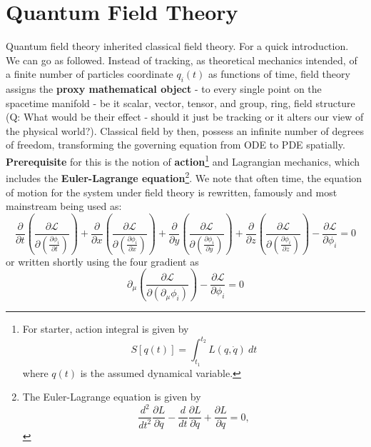 \documentclass[10pt]{article}
\begin{document}
\section{Quantum Field Theory}

Quantum field theory inherited classical field theory. For a quick introduction. We can go as followed. Instead of tracking, as theoretical mechanics intended, of a finite number of particles coordinate $q_{i}(t)$ as functions of time, field theory assigns the \textbf{proxy mathematical object} - to every single point on the spacetime manifold - be it scalar, vector, tensor, and group, ring, field structure (Q: What would be their effect - should it just be tracking or it alters our view of the physical world?). Classical field by then, possess an infinite number of degrees of freedom, transforming the governing equation from ODE to PDE spatially. \textbf{Prerequisite} for this is the notion of \textbf{action}\footnote{For starter, action integral is given by \begin{equation}
  S[q(t)] = \int_{t_{1}}^{t_2} L(q,\dot{q})\: dt
\end{equation}where $q(t)$ is the assumed dynamical variable.} and Lagrangian mechanics, which includes the \textbf{Euler-Lagrange equation}\footnote{The Euler-Lagrange equation is given by \begin{equation}
  \frac{d^2}{dt^2} \frac{\partial L}{\partial \ddot{q}} - \frac{d}{dt} \frac{\partial L}{\partial \dot{q}} + \frac{\partial L}{\partial q} = 0,
\end{equation}}. We note that often time, the equation of motion for the system under field theory is rewritten, famously and most mainstream being used as: 
\begin{equation}
  \frac{\partial}{\partial t} \left( \frac{\partial \mathcal{L}}{\partial \left(\frac{\partial \phi_i}{\partial t}\right)} \right) + \frac{\partial}{\partial x} \left( \frac{\partial \mathcal{L}}{\partial \left(\frac{\partial \phi_i}{\partial x}\right)} \right) + \frac{\partial}{\partial y} \left( \frac{\partial \mathcal{L}}{\partial \left(\frac{\partial \phi_i}{\partial y}\right)} \right) + \frac{\partial}{\partial z} \left( \frac{\partial \mathcal{L}}{\partial \left(\frac{\partial \phi_i}{\partial z}\right)} \right) - \frac{\partial \mathcal{L}}{\partial \phi_i} = 0
\end{equation}
or written shortly using the four gradient as
\begin{equation}
  \partial_\mu \left( \frac{\partial \mathcal{L}}{\partial (\partial_\mu \phi_i)} \right) - \frac{\partial \mathcal{L}}{\partial \phi_i} = 0
\end{equation}
\end{document}
